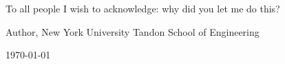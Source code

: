 \large


To all people I wish to acknowledge: why did you let me do this?


\bigskip\medskip

\noindent \hfill Author, New York University Tandon School of Engineering

\hfill \today

